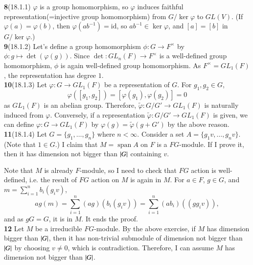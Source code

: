 \documentclass[a4paper, 12pt]{article}
\theoremstyle{Mydefinition}
\theoremstyle{Mytheorem}
\DeclareMathOperator{\spn}{span}
\begin{document}
\noindent \textbf{8}(18.1.1)
$\varphi$ is a group homomorphism, so $\varphi$ induces faithful representation(=injective group homomorphism) from $G/\ker\varphi$ to $GL(V)$. (If $\varphi(a)=\varphi(b)$, then $\varphi(ab^{-1}) = \mathrm{id}$, so $ab^{-1}\in \ker\varphi$, and $[a]=[b]$ in $G/\ker\varphi$.)\\

\noindent \textbf{9}(18.1.2)
Let's define a group homomorphism $\phi:G\rightarrow F^\times$ by $\phi:g\mapsto \det(\varphi(g))$. Since $\det:GL_n(F)\rightarrow F^\times$ is a well-defined group homomorphism, $\phi$ is again well-defined group homomorphism. As $F^\times = GL_1(F)$, the representation has degree $1$.\\

\noindent \textbf{10}(18.1.3)
Let $\varphi:G\rightarrow GL_1(F)$ be a representation of $G$. For $g_1,g_2\in G$,
\begin{equation}
    \varphi([g_1,g_2]) = [\varphi(g_1),\varphi(g_2)] = 0
\end{equation}
as $GL_1(F)$ is an abelian group. Therefore, $\tilde{\varphi}:G/G'\rightarrow GL_1(F)$ is naturally induced from $\varphi$. Conversely, if a representation $\tilde{\varphi}:G/G'\rightarrow GL_1(F)$ is given, we can define $\varphi:G\rightarrow GL_1(F)$ by $\varphi(g) = \tilde{\varphi}(g+G')$ by the above reason.\\

\noindent \textbf{11}(18.1.4)
Let $G=\{g_1, \ldots, g_n\}$ where $n<\infty$. Consider a set $A = \{g_1v, \ldots, g_n v\}$. (Note that $1\in G$.) I claim that $M=\spn A$ on $F$ is a $FG$-module. If I prove it, then it has dimension not bigger than $\abs{G}$ containing $v$.

Note that $M$ is already $F$-module, so I need to check that $FG$ action is well-defined, i.e. the result of $FG$ action on $M$ is again in $M$. For $a\in F$, $g\in G$, and $m = \sum_{i=1}^n b_i(g_iv)$,
\begin{equation}
    ag(m) = \sum_{i=1}^n (ag)(b_i(g_iv)) = \sum_{i=1}^n (ab_i)((gg_iv)),
\end{equation}
and as $gG = G$, it is in $M$. It ends the proof.\\

\noindent \textbf{12}
Let $M$ be a irreducible $FG$-module. By the above exercise, if $M$ has dimension bigger than $\abs{G}$, then it has non-trivial submodule of dimension not bigger than $\abs{G}$ by choosing $v\neq 0$, which is contradiction. Therefore, I can assume $M$ has dimension not bigger than $\abs{G}$.
\end{document}
